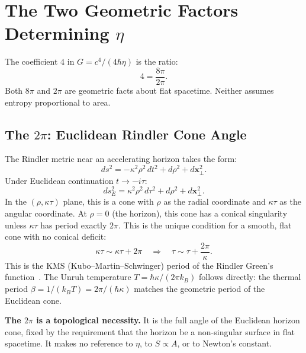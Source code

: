 \documentclass[12pt,a4paper]{article}
\begin{document}
\section{The Two Geometric Factors Determining $\eta$}
\label{sec:factors}

The coefficient $4$ in $G = c^4/(4\hbar\eta)$ is the ratio:
\begin{equation}
4 = \frac{8\pi}{2\pi}.
\label{eq:four}
\end{equation}
Both $8\pi$ and $2\pi$ are geometric facts about flat spacetime. Neither
assumes entropy proportional to area.

\subsection{The $2\pi$: Euclidean Rindler Cone Angle}

The Rindler metric near an accelerating horizon takes the form:
\begin{equation}
ds^2 = -\kappa^2\rho^2\,dt^2 + d\rho^2 + d\mathbf{x}_\perp^2.
\label{eq:rindler}
\end{equation}
Under Euclidean continuation $t \to -i\tau$:
\begin{equation}
ds^2_E = \kappa^2\rho^2\,d\tau^2 + d\rho^2 + d\mathbf{x}_\perp^2.
\label{eq:euclidean_rindler}
\end{equation}
In the $(\rho, \kappa\tau)$ plane, this is a cone with $\rho$ as the
radial coordinate and $\kappa\tau$ as the angular coordinate. At $\rho = 0$
(the horizon), this cone has a conical singularity unless $\kappa\tau$ has
period exactly $2\pi$. This is the unique condition for a smooth, flat
cone with no conical deficit:
\begin{equation}
\kappa\tau \sim \kappa\tau + 2\pi
\quad \Longrightarrow \quad
\tau \sim \tau + \frac{2\pi}{\kappa}.
\label{eq:period}
\end{equation}
This is the KMS (Kubo--Martin--Schwinger) period of the Rindler
Green's function~\citep{Unruh1976,Bisognano1976}. The Unruh temperature
$T = \hbar\kappa/(2\pi k_B)$ follows directly: the thermal period
$\beta = 1/(k_B T) = 2\pi/(\hbar\kappa)$ matches the geometric period
of the Euclidean cone.

\textbf{The $2\pi$ is a topological necessity.} It is the full angle
of the Euclidean horizon cone, fixed by the requirement that the horizon
be a non-singular surface in flat spacetime. It makes no reference to
$\eta$, to $S \propto A$, or to Newton's constant.
\end{document}
